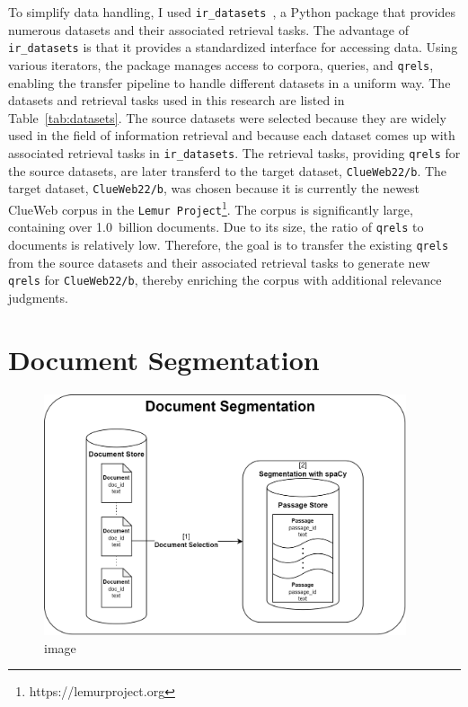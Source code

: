 To simplify data handling, I used \texttt{ir\_datasets}~\citep{macavaney:2021}, a Python package that provides numerous datasets and their associated retrieval tasks. The advantage of \texttt{ir\_datasets} is that it provides a standardized interface for accessing data. Using various iterators, the package manages access to corpora, queries, and \texttt{qrels}, enabling the transfer pipeline to handle different datasets in a uniform way. The datasets and retrieval tasks used in this research are listed in Table~\ref{tab:datasets}. The source datasets were selected because they are widely used in the field of information retrieval and because each dataset comes up with associated retrieval tasks in \texttt{ir\_datasets}. The retrieval tasks, providing \texttt{qrels} for the source datasets, are later transferd to the target dataset, \texttt{ClueWeb22/b}. The target dataset, \texttt{ClueWeb22/b}, was chosen because it is currently the newest ClueWeb corpus in the \texttt{Lemur Project}\footnote{https://lemurproject.org}. The corpus is significantly large, containing over 1.0~billion documents. Due to its size, the ratio of \texttt{qrels} to documents is relatively low. Therefore, the goal is to transfer the existing \texttt{qrels} from the source datasets and their associated retrieval tasks to generate new \texttt{qrels} for \texttt{ClueWeb22/b}, thereby enriching the corpus with additional relevance judgments. 


\section{Document Segmentation}\label{document-segmentation}

\begin{figure}[ht]
    \centering
    \includegraphics[width=0.95\textwidth]{./graphics/drawio/document_segmentation.png}
    \caption{image}
\end{figure}

